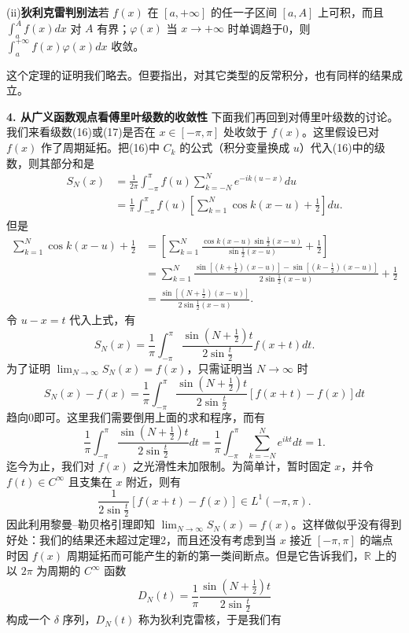(ii)\textbf{狄利克雷判别法}\quad 若 $f(x)$ 在 $[a,+\infty]$ 的任一子区间 $[a,A]$ 上可积，而且 $\int_a^Af(x)dx$ 对 $A$ 有界；$\varphi(x)$ 当 $x\to+\infty$ 时单调趋于0，则 $\int_a^{+\infty}f(x)\varphi(x)dx$ 收敛。

这个定理的证明我们略去。但要指出，对其它类型的反常积分，也有同样的结果成立。

\noindent\textbf{4. 从广义函数观点看傅里叶级数的收敛性}\quad
下面我们再回到对傅里叶级数的讨论。我们来看级数(16)或(17)是否在 $x\in[-\pi,\pi]$ 处收敛于 $f(x)$。这里假设已对 $f(x)$ 作了周期延拓。把(16)中 $C_k$ 的公式（积分变量换成 $u$）代入(16)中的级数，则其部分和是
\[
 \begin{aligned}
 S_N(x)&=\frac1{2\pi}\int_{-\pi}^{\pi}f(u)\sum_{k=-N}^{N}e^{-ik(u-x)}du\\
 &=\frac1\pi\int_{-\pi}^{\pi}f(u)\left[\sum_{k=1}^{N}\cos k(x-u)+\frac12\right]du.
 \end{aligned}
\]
但是
\[
 \begin{aligned}
 \sum_{k=1}^{N}\cos k(x-u)+\frac12
 &=\left[\sum_{k=1}^{N}\frac{\cos k(x-u)\sin\frac12(x-u)}{\sin\frac12(x-u)}+\frac12\right]\\
 &=\sum_{k=1}^{N}\frac{\sin[(k+\frac12)(x-u)]-\sin[(k-\frac12)(x-u)]}{2\sin\frac12(x-u)}+\frac12\\
 &=\frac{\sin[(N+\frac12)(x-u)]}{2\sin\frac12(x-u)}.
 \end{aligned}
\]
令 $u-x=t$ 代入上式，有
\[
 S_N(x)=\frac1\pi\int_{-\pi}^{\pi}
 \frac{\sin(N+\frac12)t}{2\sin\frac t2}f(x+t)dt.
\]
为了证明 $\lim_{N\to\infty}S_N(x)=f(x)$，只需证明当 $N\to\infty$ 时
\begin{equation}
 S_N(x)-f(x)=\frac1\pi\int_{-\pi}^{\pi}
 \frac{\sin(N+\frac12)t}{2\sin\frac t2}[f(x+t)-f(x)]dt
 \tag{25}
\end{equation}
趋向0即可。这里我们需要倒用上面的求和程序，而有
\[
 \frac1\pi\int_{-\pi}^{\pi}\frac{\sin(N+\frac12)t}{2\sin\frac t2}dt
 =\frac1\pi\int_{-\pi}^{\pi}\sum_{k=-N}^{N}e^{ikt}dt=1.
\]
迄今为止，我们对 $f(x)$ 之光滑性未加限制。为简单计，暂时固定 $x$，并令 $f(t)\in C^\infty$ 且支集在 $x$ 附近，则有
\[
 \frac1{2\sin\frac t2}[f(x+t)-f(x)]\in L^1(-\pi,\pi).
\]
因此利用黎曼--勒贝格引理即知 $\lim_{N\to\infty}S_N(x)=f(x)$。这样做似乎没有得到好处：我们的结果还未超过定理2，而且还没有考虑到当 $x$ 接近 $[-\pi,\pi]$ 的端点时因 $f(x)$ 周期延拓而可能产生的新的第一类间断点。但是它告诉我们，$\mathbb R$ 上的以 $2\pi$ 为周期的 $C^\infty$ 函数
\[
 D_N(t)=\frac1\pi\frac{\sin(N+\frac12)t}{2\sin\frac t2}
\]
构成一个 $\delta$ 序列，$D_N(t)$ 称为狄利克雷核，于是我们有

